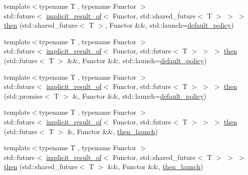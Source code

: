 \begin{DoxyCompactItemize}
\item 
{\footnotesize template$<$typename T , typename Functor $>$ }\\std\+::future$<$ \hyperlink{namespacethenable_a1ecf08d6ad8b8688d7b4df047b5feaae}{implicit\+\_\+result\+\_\+of}$<$ Functor, std\+::shared\+\_\+future$<$ T $>$ $>$ $>$ \hyperlink{namespacethenable_ad47a2c35aefe434a7be8c074b1dda08a}{then} (std\+::shared\+\_\+future$<$ T $>$, Functor \&\&, std\+::launch=\hyperlink{namespacethenable_a55a20a452e9ba9c0eff946d9b8636f06}{default\+\_\+policy})
\item 
{\footnotesize template$<$typename T , typename Functor $>$ }\\std\+::future$<$ \hyperlink{namespacethenable_a1ecf08d6ad8b8688d7b4df047b5feaae}{implicit\+\_\+result\+\_\+of}$<$ Functor, std\+::future$<$ T $>$ $>$ $>$ \hyperlink{namespacethenable_a90ae1a436866f21049d7a00a350eb3db}{then} (std\+::future$<$ T $>$ \&\&, Functor \&\&, std\+::launch=\hyperlink{namespacethenable_a55a20a452e9ba9c0eff946d9b8636f06}{default\+\_\+policy})
\item 
{\footnotesize template$<$typename T , typename Functor $>$ }\\std\+::future$<$ \hyperlink{namespacethenable_a1ecf08d6ad8b8688d7b4df047b5feaae}{implicit\+\_\+result\+\_\+of}$<$ Functor, std\+::future$<$ T $>$ $>$ $>$ \hyperlink{namespacethenable_a5e3ae302e707336194333b10694e1fce}{then} (std\+::promise$<$ T $>$ \&, Functor \&\&, std\+::launch=\hyperlink{namespacethenable_a55a20a452e9ba9c0eff946d9b8636f06}{default\+\_\+policy})
\item 
{\footnotesize template$<$typename T , typename Functor $>$ }\\std\+::future$<$ \hyperlink{namespacethenable_a1ecf08d6ad8b8688d7b4df047b5feaae}{implicit\+\_\+result\+\_\+of}$<$ Functor, std\+::future$<$ T $>$ $>$ $>$ \hyperlink{namespacethenable_ab8091f2d67ec80c1f1df9e8f10ed099f}{then} (std\+::future$<$ T $>$ \&, Functor \&\&, \hyperlink{namespacethenable_adf31291b806157ad914943dae5b3c94e}{then\+\_\+launch})
\item 
{\footnotesize template$<$typename T , typename Functor $>$ }\\std\+::future$<$ \hyperlink{namespacethenable_a1ecf08d6ad8b8688d7b4df047b5feaae}{implicit\+\_\+result\+\_\+of}$<$ Functor, std\+::shared\+\_\+future$<$ T $>$ $>$ $>$ \hyperlink{namespacethenable_acdaaca11a1470419997f4b476dcd7f0e}{then} (std\+::shared\+\_\+future$<$ T $>$ \&\&, Functor \&\&, \hyperlink{namespacethenable_adf31291b806157ad914943dae5b3c94e}{then\+\_\+launch})
\item 

\end{DoxyCompactItemize}

